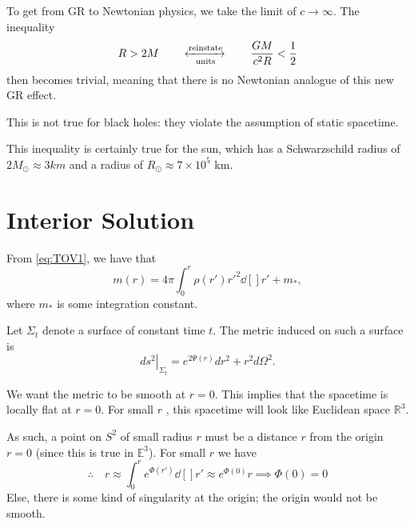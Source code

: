 \begin{remark}
  To get from GR to Newtonian physics, we take the limit of $c \to \infty$. The inequality
  \begin{equation}
    R > 2M \qquad \xleftrightarrow[\text{units}]{\text{reinstate}} \qquad \frac{GM}{c^2 R} < \frac{1}{2}
  \end{equation}
  then becomes trivial, meaning that there is no Newtonian analogue of this new GR effect.
\end{remark}

 \begin{leftbar}
  \begin{remark}
    This is not true for black holes: they violate the assumption of static spacetime.
  \end{remark}
\end{leftbar}

This inequality is certainly true for the sun, which has a Schwarzschild radius of $2 M_\odot \approx 3 km$ and a radius of $R_{\odot} \approx 7 \times 10^5$ km.

\section{Interior Solution}%
\label{sec:interior_solution}

From \eqref{eq:TOV1}, we have that
\begin{equation}
  m(r) = 4 \pi \int_{0}^r \rho(r') {r'}^2 \dd[]{r'} + m_{*} \label{eq:2-dag},
\end{equation}
where $m_*$ is some integration constant.

Let $\Sigma_t$  denote a surface of constant time $t$.
The metric induced on such a surface is
 \begin{equation}
  \left.ds^2\right\rvert_{\Sigma_t} = e^{2 \Psi(r)} dr^2 + r^2 d\Omega^2.
\end{equation}

We want the metric to be smooth at $r = 0$.
This implies that the spacetime is locally flat at  $r = 0$. For small  $r$ , this spacetime will look like Euclidean space $\mathbb{R}^3$.

As such, a point on $S^2$  of small radius $r$  must be a distance $r$  from the origin $r = 0$  (since this is true in $\mathbb{E}^3$).
For small $r$ we have
\begin{equation}
  \therefore \quad r \approx \int_0^r e^{\Phi(r')} \dd[]{r'} \approx e^{\Phi(0)} r \implies \Phi(0) = 0
\end{equation}
Else, there is some kind of singularity at the origin; the origin would not be smooth.

